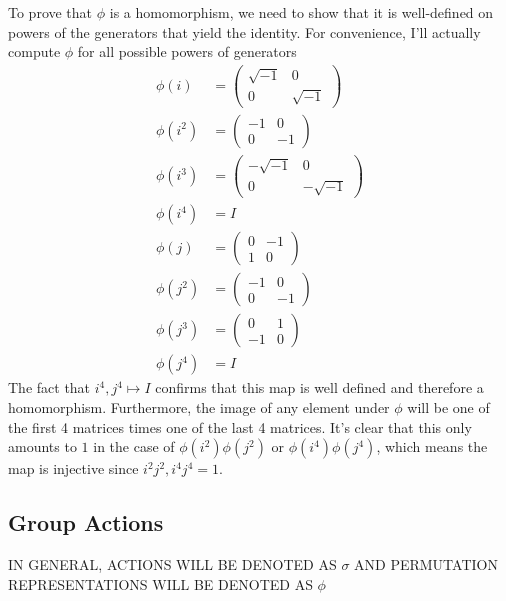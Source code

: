 \documentclass{article}
\begin{document}
\subsubsection{}\label{ex6p26}
To prove that $\phi$ is a homomorphism, we need to show that it is well-defined on powers of the generators that yield the identity. For convenience, I'll actually compute $\phi$ for all possible powers of generators
\begin{align*}
\phi(i) &= 
\begin{pmatrix}
\sqrt{-1} 	& 0\\
0			& \sqrt{-1}
\end{pmatrix}\\
\phi(i^2) &= 
\begin{pmatrix}
-1 	& 0\\
0	& -1
\end{pmatrix}\\
\phi(i^3) &= 
\begin{pmatrix}
-\sqrt{-1} 	& 0\\
0	& -\sqrt{-1}
\end{pmatrix}\\
\phi(i^4) &= I\\
\phi(j) &= 
\begin{pmatrix}
0 	&	-1\\
1	&	0
\end{pmatrix}\\
\phi(j^2) &= 
\begin{pmatrix}
-1 	&	0\\
0	&	-1
\end{pmatrix}\\
\phi(j^3) &= 
\begin{pmatrix}
0	&	1\\
-1	&	0
\end{pmatrix}\\
\phi(j^4) &= I
\end{align*}
The fact that $i^4,j^4 \mapsto I$ confirms that this map is well defined and therefore a homomorphism. Furthermore, the image of any element under $\phi$ will be one of the first 4 matrices times one of the last 4 matrices. It's clear that this only amounts to $1$ in the case of $\phi(i^2)\phi(j^2)$ or $\phi(i^4)\phi(j^4)$, which means the map is injective since $i^2j^2,i^4j^4=1$.
\subsection{Group Actions}  
IN GENERAL, ACTIONS WILL BE DENOTED AS $\sigma$ AND PERMUTATION REPRESENTATIONS WILL BE DENOTED AS $\phi$
\end{document}
